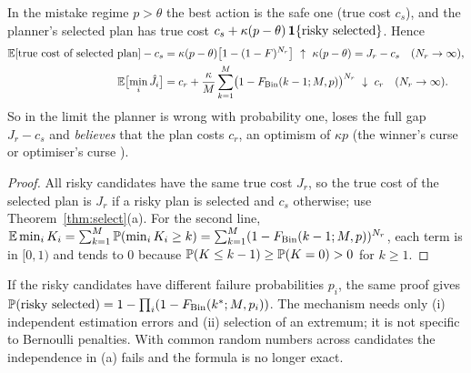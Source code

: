 \begin{theorem}\label{thm:excess}
In the mistake regime $p>\theta$ the best action is the safe one (true cost $c_s$), and the planner's selected plan has true cost $c_s+\kappa(p-\theta)\,\mathbf 1\{\text{risky selected}\}$. Hence
\begin{align*}
\EE[\text{true cost of selected plan}]-c_s&=\kappa(p-\theta)\bigl[1-(1-F)^{N_r}\bigr]\ \uparrow\ \kappa(p-\theta)=J_r-c_s\quad(N_r\to\infty),\\
\EE\bigl[\min_i\hat J_i\bigr]&=c_r+\frac\kappa M\sum_{k=1}^{M}\bigl(1-F_{\Bin}(k-1;M,p)\bigr)^{N_r}\ \downarrow\ c_r\quad(N_r\to\infty).
\end{align*}
So in the limit the planner is wrong with probability one, loses the full gap $J_r-c_s$ and \emph{believes} that the plan costs $c_r$, an optimism of $\kappa p$ (the winner's curse or optimiser's curse \cite{smith2006}).
\end{theorem}
\begin{proof}
All risky candidates have the same true cost $J_r$, so the true cost of the selected plan is $J_r$ if a risky plan is selected and $c_s$ otherwise; use Theorem~\ref{thm:select}(a).
For the second line, $\mathbb{E}\min_iK_i=\sum_{k=1}^M\mathbb{P}(\min_iK_i\ge k)=\sum_{k=1}^M(1-F_{\operatorname{Bin}}(k-1;M,p))^{N_r}$, each term is in $[0,1)$ and tends to $0$ because $\mathbb{P}(K\le k-1)\ge\mathbb{P}(K=0)>0$ for $k\ge1$.
\end{proof}

\begin{remark}
If the risky candidates have different failure probabilities $p_i$, the same proof gives $\mathbb{P}(\text{risky selected})=1-\prod_i(1-F_{\operatorname{Bin}}(k^*;M,p_i))$.
The mechanism needs only (i) independent estimation errors and (ii) selection of an extremum; it is not specific to Bernoulli penalties.
With common random numbers across candidates the independence in (a) fails and the formula is no longer exact.
\end{remark}

